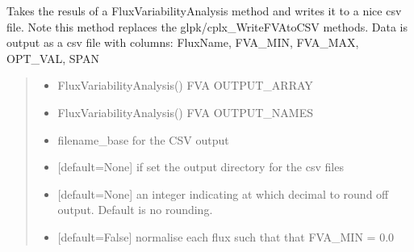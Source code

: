 \documentclass[letterpaper,12pt,english]{sphinxmanual}
\begin{document}
\begin{fulllineitems}

\pysigstartsignatures
\pysiglinewithargsret
{}
{\sphinxparamcomma {}\sphinxparamcomma {}\sphinxparamcomma {}\sphinxparamcomma {}\sphinxparamcomma {}\sphinxparamcomma {}\sphinxparamcomma {}}
{}
\pysigstopsignatures
\sphinxAtStartPar
Takes the resuls of a FluxVariabilityAnalysis method and writes it to a nice csv file. Note this method replaces the glpk/cplx\_WriteFVAtoCSV methods. Data is output as a csv file with columns: FluxName, FVA\_MIN, FVA\_MAX, OPT\_VAL, SPAN
\begin{quote}\begin{description}
\begin{itemize}
\item {} 
\sphinxAtStartPar
{} \textendash{} FluxVariabilityAnalysis() FVA OUTPUT\_ARRAY

\item {} 
\sphinxAtStartPar
{} \textendash{} FluxVariabilityAnalysis() FVA OUTPUT\_NAMES

\item {} 
\sphinxAtStartPar
{} \textendash{} filename\_base for the CSV output

\item {} 
\sphinxAtStartPar
{} \textendash{} {[}default=None{]} if set the output directory for the csv files

\item {} 
\sphinxAtStartPar
{} \textendash{} {[}default=None{]} an integer indicating at which decimal to round off output. Default is no rounding.

\item {} 
\sphinxAtStartPar
{} \textendash{} {[}default=False{]} normalise each flux such that that FVA\_MIN = 0.0


\end{itemize}
\end{description}
\end{quote}
\end{fulllineitems}
\end{document}
